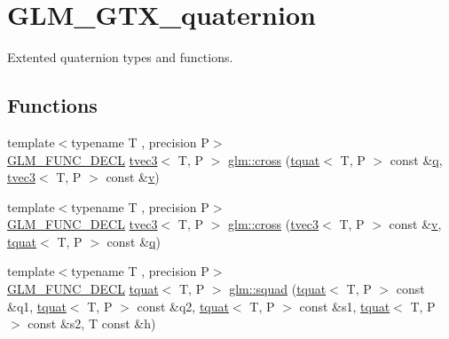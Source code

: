 \hypertarget{group__gtx__quaternion}{}\section{G\+L\+M\+\_\+\+G\+T\+X\+\_\+quaternion}
\label{group__gtx__quaternion}


Extented quaternion types and functions.  


\subsection*{Functions}
\begin{DoxyCompactItemize}
\item 
{\footnotesize template$<$typename T , precision P$>$ }\\\mbox{\hyperlink{setup_8hpp_ab2d052de21a70539923e9bcbf6e83a51}{G\+L\+M\+\_\+\+F\+U\+N\+C\+\_\+\+D\+E\+CL}} \mbox{\hyperlink{structglm_1_1tvec3}{tvec3}}$<$ T, P $>$ \mbox{\hyperlink{group__gtx__quaternion_ga33ecf8ba903eee5fc09f0fbfc0d5ca6b}{glm\+::cross}} (\mbox{\hyperlink{structglm_1_1tquat}{tquat}}$<$ T, P $>$ const \&\mbox{\hyperlink{glad_8h_a514729309336df22bcc8eda979d6ced4}{q}}, \mbox{\hyperlink{structglm_1_1tvec3}{tvec3}}$<$ T, P $>$ const \&\mbox{\hyperlink{glad_8h_a14cfbe2fc2234f5504618905b69d1e06}{v}})
\item 
{\footnotesize template$<$typename T , precision P$>$ }\\\mbox{\hyperlink{setup_8hpp_ab2d052de21a70539923e9bcbf6e83a51}{G\+L\+M\+\_\+\+F\+U\+N\+C\+\_\+\+D\+E\+CL}} \mbox{\hyperlink{structglm_1_1tvec3}{tvec3}}$<$ T, P $>$ \mbox{\hyperlink{group__gtx__quaternion_ga4bfe3c7770fc43d14b8ef0058c4a86b5}{glm\+::cross}} (\mbox{\hyperlink{structglm_1_1tvec3}{tvec3}}$<$ T, P $>$ const \&\mbox{\hyperlink{glad_8h_a14cfbe2fc2234f5504618905b69d1e06}{v}}, \mbox{\hyperlink{structglm_1_1tquat}{tquat}}$<$ T, P $>$ const \&\mbox{\hyperlink{glad_8h_a514729309336df22bcc8eda979d6ced4}{q}})
\item 
{\footnotesize template$<$typename T , precision P$>$ }\\\mbox{\hyperlink{setup_8hpp_ab2d052de21a70539923e9bcbf6e83a51}{G\+L\+M\+\_\+\+F\+U\+N\+C\+\_\+\+D\+E\+CL}} \mbox{\hyperlink{structglm_1_1tquat}{tquat}}$<$ T, P $>$ \mbox{\hyperlink{group__gtx__quaternion_gae75f537becdf2b1381b4482ec96e6c82}{glm\+::squad}} (\mbox{\hyperlink{structglm_1_1tquat}{tquat}}$<$ T, P $>$ const \&q1, \mbox{\hyperlink{structglm_1_1tquat}{tquat}}$<$ T, P $>$ const \&q2, \mbox{\hyperlink{structglm_1_1tquat}{tquat}}$<$ T, P $>$ const \&s1, \mbox{\hyperlink{structglm_1_1tquat}{tquat}}$<$ T, P $>$ const \&s2, T const \&h)

\end{DoxyCompactItemize}
